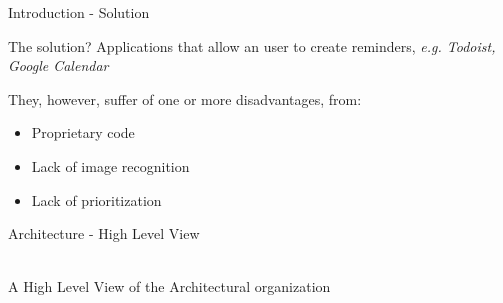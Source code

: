 \documentclass[newPxFont,noprogressbar,table]{beamer}
\begin{document}
	\begin{frame}{Introduction - Solution }
		
		\vspace*{-3em}
		\textcolor{sthlmBlue}{The solution?} Applications that allow an user to create reminders, \emph{e.g. Todoist, Google Calendar}
		
		They, however, suffer of one or more disadvantages, from:
		\begin{itemize}
			\item Proprietary code
			\item Lack of image recognition
			\item Lack of prioritization
		\end{itemize}
		
	\end{frame}
	
	\begin{frame}{Architecture - High Level View}
		
		\vspace*{-2em}
		\centering
		\\
		A High Level View of the Architectural organization
	\end{frame}
	
\end{document}
